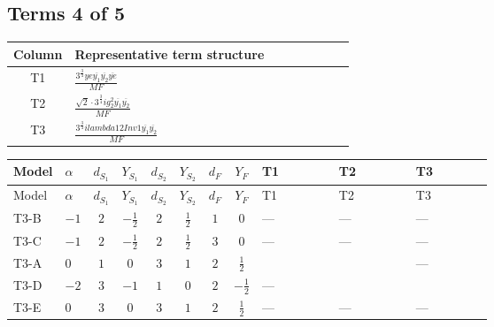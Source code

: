 \documentclass[8pt]{article}
\begin{document}
\begin{landscape}
\subsection*{Terms 4 of 5}
\begin{center}
\begin{tabular}{@{}c >{\raggedright\arraybackslash}p{0.82\linewidth}@{}}
\toprule
Column & Representative term structure \\
\midrule
T1 & \(\displaystyle \frac{3^{\frac{3}{4}} ye \overline{y_{1}} \overline{y_{2}} \overline{ye}}{MF}\) \\
\midrule
T2 & \(\displaystyle \frac{\sqrt{2} \cdot 3^{\frac{3}{4}} i g_{2}^{2} \overline{y_{1}} \overline{y_{2}}}{MF}\) \\
\midrule
T3 & \(\displaystyle \frac{3^{\frac{3}{4}} i lambda12Inv1 \overline{y_{1}} \overline{y_{2}}}{MF}\) \\
\midrule
\bottomrule
\end{tabular}
\end{center}
\smallskip
\tiny
\begin{longtable}{@{}llcccccc >{\raggedright\arraybackslash}p{0.21\linewidth} >{\raggedright\arraybackslash}p{0.21\linewidth} >{\raggedright\arraybackslash}p{0.21\linewidth}@{}}
\toprule
Model & $\alpha$ & $d_{S_1}$ & $Y_{S_1}$ & $d_{S_2}$ & $Y_{S_2}$ & $d_F$ & $Y_F$ & T1 & T2 & T3 \\
\midrule
\endfirsthead
\toprule
Model & $\alpha$ & $d_{S_1}$ & $Y_{S_1}$ & $d_{S_2}$ & $Y_{S_2}$ & $d_F$ & $Y_F$ & T1 & T2 & T3 \\
\midrule
\endhead
T3-B & $-1$ & $2$ & $-\frac{1}{2}$ & $2$ & $\frac{1}{2}$ & $1$ & $0$ & --- & --- & --- \\
\midrule
T3-C & $-1$ & $2$ & $-\frac{1}{2}$ & $2$ & $\frac{1}{2}$ & $3$ & $0$ & --- & --- & --- \\
\midrule
T3-A & $0$ & $1$ & $0$ & $3$ & $1$ & $2$ & $\frac{1}{2}$ & \scriptsize\adjustbox{max width=\linewidth}{$\begin{gathered} \frac{3^{\frac{3}{4}} ye \overline{y_{1}} \overline{y_{2}} \overline{ye}}{12 MF}\end{gathered}$} & \scriptsize\adjustbox{max width=\linewidth}{$\begin{gathered} - \frac{\sqrt{2} \cdot 3^{\frac{3}{4}} i g_{2}^{2} \overline{y_{1}} \overline{y_{2}}}{3 MF}\end{gathered}$} & --- \\
\midrule
T3-D & $-2$ & $3$ & $-1$ & $1$ & $0$ & $2$ & $-\frac{1}{2}$ & --- & \scriptsize\adjustbox{max width=\linewidth}{$\begin{gathered} \frac{\sqrt{2} \cdot 3^{\frac{3}{4}} i g_{2}^{2} \overline{y_{1}} \overline{y_{2}}}{3 MF}\end{gathered}$} & \scriptsize\adjustbox{max width=\linewidth}{$\begin{gathered} \frac{3^{\frac{3}{4}} i lambda12Inv1 \overline{y_{1}} \overline{y_{2}}}{6 MF}\end{gathered}$} \\
\midrule
T3-E & $0$ & $3$ & $0$ & $3$ & $1$ & $2$ & $\frac{1}{2}$ & --- & --- & --- \\
\midrule
\bottomrule
\end{longtable}
\clearpage

\end{landscape}
\end{document}
